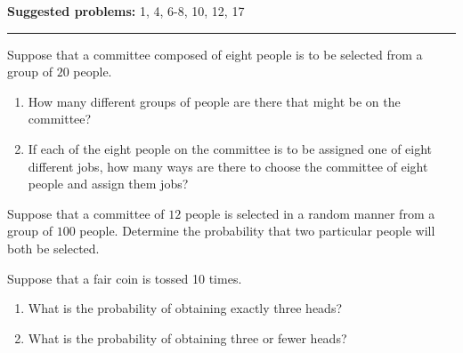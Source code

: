 \documentclass[12pt,reqno]{amsart}
\begin{document}
\textbf{Suggested problems:} 1, 4, 6-8, 10, 12, 17

\bigskip
\hrule

\bigskip

\prob Suppose that a committee composed of eight people is to be selected from a group of $20$ people.

\medskip
\begin{enumerate}
\item How many different groups of people are there that might be on the committee?\vfill
\item If each of the eight people on the committee is to be assigned one of eight different jobs, how many ways are there to choose the committee of eight people and assign them jobs?
\end{enumerate}

\vfill
\prob Suppose that a committee of $12$ people is selected in a random manner from a group of $100$ people. Determine the probability that two particular people will both be selected.

\vfill
\newpage
\prob Suppose that a fair coin is tossed 10 times.

\medskip
\begin{enumerate}
\item What is the probability of obtaining exactly three heads?\vfill
\item What is the probability of obtaining three or fewer heads?\vfill
\end{enumerate}
\end{document}
